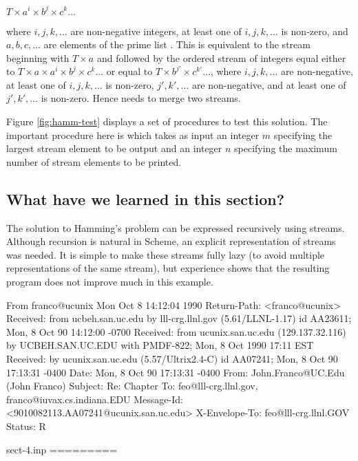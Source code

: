 \begin{center}
$T \times a^i \times b^j \times c^k \ldots\ $
\end{center}

\noindent
where $i, j, k, \ldots$ are non-negative integers, at least one of $i,
j, k, \ldots$ is non-zero, and $a, b, c, \ldots$ are elements of the
prime list .  This is equivalent to the stream beginning with
$T \times a$ and followed by the ordered stream of integers
equal either to
        $T \times a \times a^i \times b^j \times c^k \ldots$
or equal to
        $T \times b^{j'} \times c^{k'} \ldots$,
where $i, j, k, \ldots$ are non-negative, at least one of $i, j, k,
\ldots$ is non-zero, $j', k', \ldots$ are non-negative, and at least
one of $j', k', \ldots$ is non-zero.  Hence  needs to merge
two streams.

Figure \ref{fig:hamm-test} displays a set of procedures to test this
solution.  The important procedure here is  which
takes as input an integer $m$ specifying the largest stream element to
be output and an integer $n$ specifying the maximum number of stream
elements to be printed.

\subsection{What have we learned in this section?}

The solution to Hamming's problem can be expressed recursively using
streams.  Although recursion is natural in Scheme, an explicit
representation of streams was needed.  It is simple to make these
streams fully lazy (to avoid multiple representations of the same
stream), but experience shows that the resulting program does not
improve much in this example.


From franco@ucunix Mon Oct  8 14:12:04 1990
Return-Path: <franco@ucunix>
Received: from ucbeh.san.uc.edu by lll-crg.llnl.gov (5.61/LLNL-1.17)
	id AA23611; Mon, 8 Oct 90 14:12:00 -0700
Received: from ucunix.san.uc.edu (129.137.32.116) by UCBEH.SAN.UC.EDU with
 PMDF-822; Mon, 8 Oct 1990 17:11 EST
Received: by ucunix.san.uc.edu (5.57/Ultrix2.4-C) id AA07241; Mon, 8 Oct 90
 17:13:31 -0400
Date: Mon, 8 Oct 90 17:13:31 -0400
From: John.Franco@UC.Edu (John Franco)
Subject: Re:  Chapter
To: feo@lll-crg.llnl.gov, franco@iuvax.cs.indiana.EDU
Message-Id: <9010082113.AA07241@ucunix.san.uc.edu>
X-Envelope-To: feo@lll-crg.llnl.GOV
Status: R

sect-4.inp
=========

